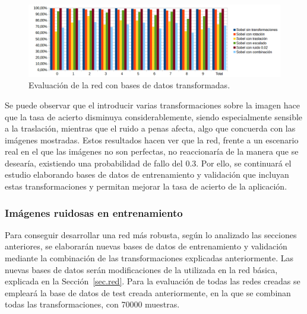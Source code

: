 \begin{figure}[H]
	\begin{center}
		\includegraphics[width=1\textwidth]{figures/sobelev}
		\caption{Evaluación de la red con bases de datos transformadas.}
		\label{fig.sobelEval}
	\end{center}
\end{figure}

Se puede observar que el introducir varias transformaciones sobre la imagen hace que la tasa de acierto disminuya considerablemente, siendo especialmente sensible a la traslación, mientras que el ruido a penas afecta, algo que concuerda con las imágenes mostradas. Estos resultados hacen ver que la red, frente a un escenario real en el que las imágenes no son perfectas, no reaccionaría de la manera que se desearía, existiendo una probabilidad de fallo del 0.3. Por ello, se continuará el estudio elaborando bases de datos de entrenamiento y validación que incluyan estas transformaciones y permitan mejorar la tasa de acierto de la aplicación.

\subsubsection{Imágenes ruidosas en entrenamiento}
Para conseguir desarrollar una red más robusta, según lo analizado las secciones anteriores, se elaborarán nuevas bases de datos de entrenamiento y validación mediante la combinación de las transformaciones explicadas anteriormente. Las nuevas bases de datos serán modificaciones de la utilizada en la red básica, explicada en la Sección~\ref{sec.red}. Para la evaluación de todas las redes creadas se empleará la base de datos de test creada anteriormente, en la que se combinan todas las transformaciones, con 70000 muestras.\\

